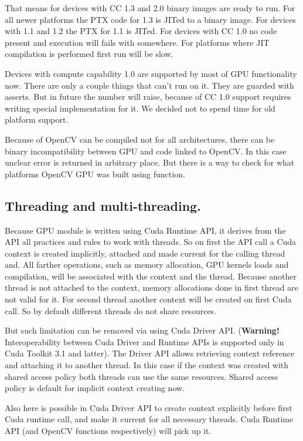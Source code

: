 That means for devices with CC 1.3 and 2.0 binary images are ready to run. For all newer platforms the PTX code for 1.3 is JITed to a binary image. For devices with 1.1 and 1.2 the PTX for 1.1 is JITed. For devices with CC 1.0 no code present and execution will fails with  somewhere. For platforms where JIT compilation is performed first run will be slow.

Devices with compute capability 1.0 are supported by most of GPU functionality now. There are only a couple things that can’t run on it. They are guarded with asserts. But in future the number will raise, because of CC 1.0 support requires writing special implementation for it.  We decided not to spend time for old platform support.

Because of OpenCV can be compiled not for all architectures, there can be binary incompatibility between GPU and code linked to OpenCV. In this case unclear error is returned in arbitrary place. But there is a way to check for what platforms OpenCV GPU was built using  function.


\subsection{Threading and multi-threading.}

Because GPU module is written using Cuda Runtime API, it derives from the API all practices and rules to work with threads. So on first the API call a Cuda context is created implicitly, attached and made current for the calling thread and. All farther operations, such as memory allocation, GPU kernels loads and compilation, will be associated with the context and the thread. Because another thread is not attached to the context, memory allocations done in first thread are not valid for it. For second thread another context will be created on first Cuda call. So by default different threads do not share resources.

But such limitation can be removed via using Cuda Driver API. (\textbf{Warning!} Interoperability between Cuda Driver and Runtime APIs is supported only in Cuda Toolkit 3.1 and latter). The Driver API allows retrieving context reference and attaching it to another thread. In this case if the context was created with shared access policy both threads can use the same resources. Shared access policy is default for implicit context creating now. 

Also here is possible in Cuda Driver API to create context explicitly before first Cuda runtime call, and make it current for all necessary threads. Cuda Runtime API (and OpenCV functions respectively) will pick up it.

